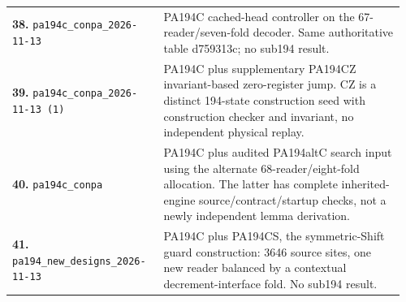 {\begin{longtable}{@{}>{\raggedright\arraybackslash}p{0.37\linewidth}>{\raggedright\arraybackslash}p{0.59\linewidth}@{}}
\textbf{38.} \nolinkurl{pa194c_conpa_2026-11-13} & PA194C cached-head controller on the 67-reader/seven-fold decoder. Same authoritative table d759313c; no sub194 result.\\[5pt]
\textbf{39.} \nolinkurl{pa194c_conpa_2026-11-13 (1)} & PA194C plus supplementary PA194CZ invariant-based zero-register jump. CZ is a distinct 194-state construction seed with construction checker and invariant, no independent physical replay.\\[5pt]
\textbf{40.} \nolinkurl{pa194c_conpa} & PA194C plus audited PA194altC search input using the alternate 68-reader/eight-fold allocation. The latter has complete inherited-engine source/contract/startup checks, not a newly independent lemma derivation.\\[5pt]
\textbf{41.} \nolinkurl{pa194_new_designs_2026-11-13} & PA194C plus PA194CS, the symmetric-Shift guard construction: 3646 source sites, one new reader balanced by a contextual decrement-interface fold. No sub194 result.\\[5pt]
\end{longtable}
}
